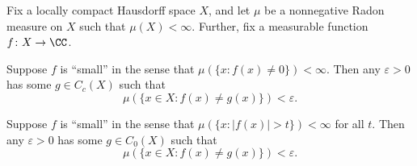 \documentclass[../notes.tex]{subfiles}
\begin{document}
\begin{theorem}[Lusin]
	Fix a locally compact Hausdorff space $X$, and let $\mu$ be a nonnegative Radon measure on $X$ such that $\mu(X)<\infty$. Further, fix a measurable function $f\colon X\to\CC$.
	\begin{listalph}
		\item Suppose $f$ is ``small'' in the sense that $\mu(\{x:f(x)\ne0\})<\infty$. Then any $\varepsilon>0$ has some $g\in C_c(X)$ such that
		\[\mu(\{x\in X:f(x)\ne g(x)\})<\varepsilon.\]
		\item Suppose $f$ is ``small'' in the sense that $\mu(\{x:\left|f(x)\right|>t\})<\infty$ for all $t$. Then any $\varepsilon>0$ has some $g\in C_0(X)$ such that
		\[\mu(\{x\in X:f(x)\ne g(x)\})<\varepsilon.\]
	\end{listalph}
\end{theorem}
\end{document}
